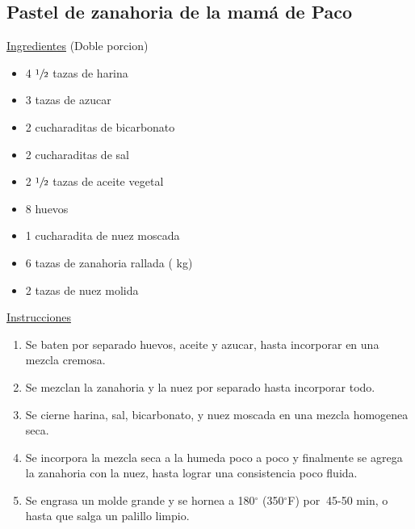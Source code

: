 \subsection{Pastel de zanahoria de la mam\'a de Paco}

\underline{Ingredientes} (Doble porcion)
\begin{itemize}
\item 4 $\sfrac{1}{2}$ tazas de harina
\item 3 tazas de azucar
\item 2 cucharaditas de bicarbonato
\item 2 cucharaditas de sal
\item 2 $\sfrac{1}{2}$ tazas de aceite vegetal
\item 8 huevos
\item 1 cucharadita de nuez moscada
\item 6 tazas de zanahoria rallada ( kg)
\item 2 tazas de nuez molida
\end{itemize}

\underline{Instrucciones}
\begin{enumerate}
\item Se baten por separado huevos, aceite y azucar, hasta incorporar en una mezcla cremosa.
\item Se mezclan la zanahoria y la nuez por separado hasta incorporar todo.
\item Se cierne harina, sal, bicarbonato, y nuez moscada en una mezcla homogenea seca.
\item Se incorpora la mezcla seca a la humeda poco a poco y finalmente se agrega la zanahoria con la nuez, hasta lograr una consistencia poco fluida.
\item Se engrasa un molde grande y se hornea a 180$^\circ$ (350$^\circ$F) por $~$45-50 min, o hasta que salga un palillo limpio.\\
\end{enumerate}
